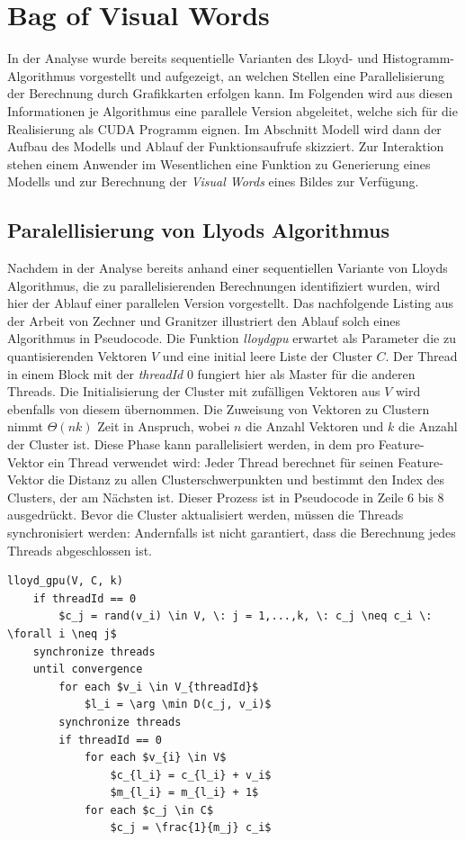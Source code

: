 \section{Bag of Visual Words}

In der Analyse wurde bereits sequentielle Varianten des Lloyd- und Histogramm-Algorithmus vorgestellt und aufgezeigt, an welchen Stellen eine Parallelisierung der Berechnung durch Grafikkarten erfolgen kann. Im Folgenden wird aus diesen Informationen je Algorithmus eine parallele Version abgeleitet, welche sich für die Realisierung als CUDA Programm eignen.
Im Abschnitt Modell wird dann der Aufbau des Modells und Ablauf der Funktionsaufrufe skizziert. Zur Interaktion stehen einem Anwender im Wesentlichen eine Funktion zu Generierung eines Modells und zur Berechnung der \textit{Visual Words} eines Bildes zur Verfügung.

\subsection{Paralellisierung von Llyods Algorithmus}

Nachdem in der Analyse bereits anhand einer sequentiellen Variante von Lloyds Algorithmus, die zu parallelisierenden Berechnungen identifiziert wurden, wird hier der Ablauf einer parallelen Version vorgestellt. Das nachfolgende Listing aus der Arbeit von Zechner und Granitzer \cite{akc2009} illustriert den Ablauf solch eines Algorithmus in Pseudocode. Die Funktion \textit{lloyd\textunderscore gpu} erwartet als Parameter die zu quantisierenden Vektoren $V$ und eine initial leere Liste der Cluster $C$. Der Thread in einem Block mit der \textit{threadId} 0 fungiert hier als Master für die anderen Threads. Die Initialisierung der Cluster mit zufälligen Vektoren aus $V$ wird ebenfalls von diesem übernommen. Die Zuweisung von Vektoren zu Clustern nimmt $\Theta(nk)$ Zeit in Anspruch, wobei $n$ die Anzahl Vektoren und $k$ die Anzahl der Cluster ist. Diese Phase kann parallelisiert werden, in dem pro Feature-Vektor ein Thread verwendet wird: Jeder Thread berechnet für seinen Feature-Vektor die Distanz zu allen Clusterschwerpunkten und bestimmt den Index des Clusters, der am Nächsten ist. Dieser Prozess ist in Pseudocode in Zeile 6 bis 8 ausgedrückt. Bevor die Cluster aktualisiert werden, müssen die Threads synchronisiert werden: Andernfalls ist nicht garantiert, dass die Berechnung jedes Threads abgeschlossen ist. 

\lstset{language=C}
\begin{lstlisting}[mathescape=true]
lloyd_gpu(V, C, k)
	if threadId == 0
		$c_j = rand(v_i) \in V, \: j = 1,...,k, \: c_j \neq c_i \: \forall i \neq j$
	synchronize threads
	until convergence
		for each $v_i \in V_{threadId}$
			$l_i = \arg \min D(c_j, v_i)$
		synchronize threads
		if threadId == 0
			for each $v_{i} \in V$
				$c_{l_i} = c_{l_i} + v_i$
				$m_{l_i} = m_{l_i} + 1$
			for each $c_j \in C$
				$c_j = \frac{1}{m_j} c_i$
\end{lstlisting}

